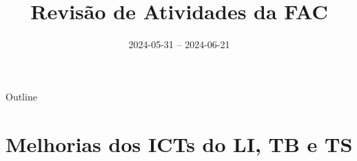 \documentclass[aspectratio=169]{beamer}            %
\title{Revisão de Atividades da FAC}	%
\institute{LNLS.DAC.FAC}				%
\date{2024-05-31 -- 2024-06-21}			%
\begin{document}
\begin{frame}
  \titlepage
  \href{https://github.com/lnls-fac/doc-review-dac-fac}{}
  \href{https://www.overleaf.com/read/sbdjxtzfchrm}{}
\end{frame}

\begin{frame}{Outline}
  \tableofcontents
\end{frame}





\section{Melhorias dos ICTs do LI, TB e TS}
\end{document}
